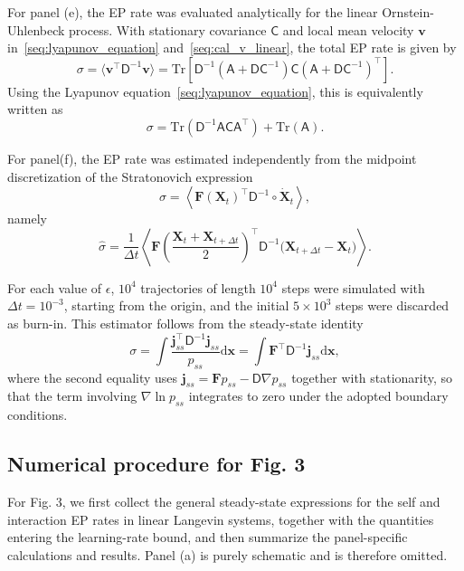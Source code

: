 \documentclass[
 longbibliography,
 twocolumn,
 superscriptaddress,
 amsmath,
 amssymb,
 amsthm,
 amsfonts,
 prl,
 floatfix,
]{revtex4-2}
\newcommand{\matbf}[1]{\boldsymbol{\mathsf{#1}}}
\begin{document}
\begin{widetext}
For panel (e), the EP rate was evaluated analytically for the linear Ornstein-Uhlenbeck process. 
With stationary covariance $\matbf C$ and local mean velocity $\bm v$ in~\eqref{seq:lyapunov_equation} and~\eqref{seq:cal_v_linear}, the total EP rate is given by
\[
    \sigma=\langle\bm v^\intercal\matbf D^{-1}\bm v\rangle=
    \mathrm{Tr}\left[\matbf D^{-1}(\matbf A+\matbf D\matbf C^{-1})\matbf C(\matbf A+\matbf D\matbf C^{-1})^\intercal\right].
\]
Using the Lyapunov equation~\eqref{seq:lyapunov_equation}, this is equivalently written as
\begin{equation}
    \sigma=\mathrm{Tr}(\matbf D^{-1}\matbf A\matbf C\matbf A^\intercal)
    +\mathrm{Tr}(\matbf A).
    \label{seq:sigma_linear}
\end{equation}

For panel(f), the EP rate was estimated independently from the midpoint discretization of the Stratonovich expression
\[
    \sigma=\left\langle\bm F(\bm X_t)^\intercal\matbf D^{-1}\circ\dot{\bm X}_t\right\rangle,
\]
namely
\[
    \hat\sigma=\frac{1}{\Delta t}\left\langle
    \bm F\left(\frac{\bm X_t+\bm X_{t+\Delta t}}{2}\right)^\intercal
    \matbf D^{-1}\big(\bm X_{t+\Delta t}-\bm X_t\big)\right\rangle.
\]

For each value of $\epsilon$, $10^4$ trajectories of length $10^4$ steps were simulated with $\Delta t=10^{-3}$, starting from the origin, and the initial $5\times10^3$ steps were discarded as burn-in. This estimator follows from the steady-state identity
\[
    \sigma=\int\frac{\bm j_{ss}^\intercal\matbf D^{-1}\bm j_{ss}}{p_{ss}}\mathrm d\bm x
    =\int\bm F^\intercal\matbf D^{-1}\bm j_{ss}\mathrm d\bm x,
\]
where the second equality uses $\bm j_{ss}=\bm Fp_{ss}-\matbf D\nabla p_{ss}$ together with stationarity, so that the term involving $\nabla\ln p_{ss}$ integrates to zero under the adopted boundary conditions.


\subsection{Numerical procedure for Fig. 3}
\vspace*{-0.6\baselineskip}

For Fig. 3, we first collect the general steady-state expressions for the self and interaction EP rates in linear Langevin systems, together with the quantities entering the learning-rate bound, and then summarize the panel-specific calculations and results. Panel (a) is purely schematic and is therefore omitted.


\end{widetext}
\end{document}

